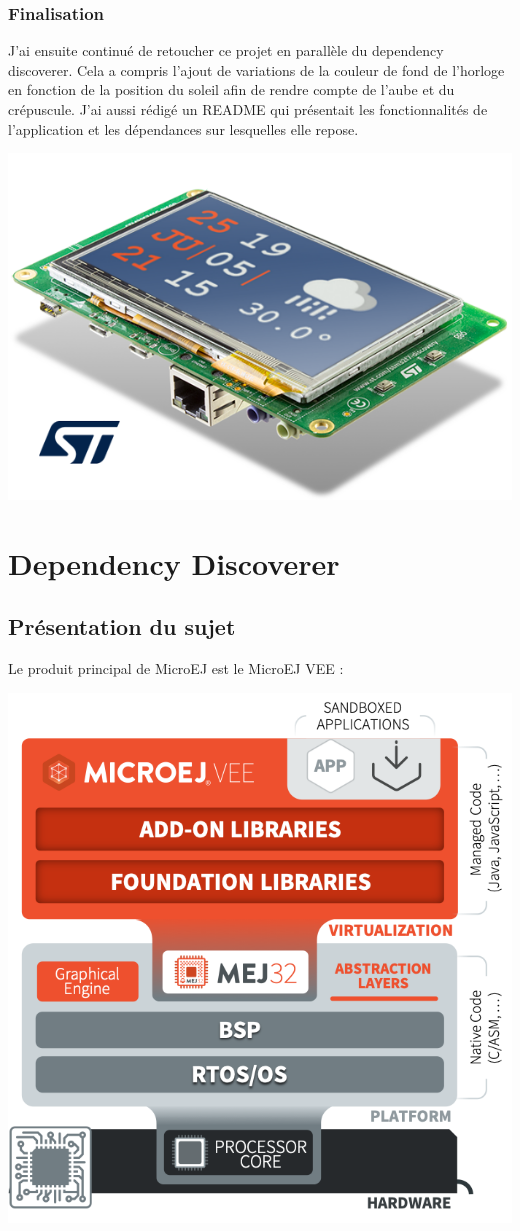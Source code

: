 \documentclass[french,a4paper,12pt]{report}
\begin{document}
\subsection{Finalisation}

J'ai ensuite continué de retoucher ce projet en parallèle du dependency discoverer. Cela a compris l'ajout de variations de la couleur de fond de l'horloge en fonction de la position du soleil afin de rendre compte de l'aube et du crépuscule. J'ai aussi rédigé un README qui présentait les fonctionnalités de l'application et les dépendances sur lesquelles elle repose.

\begin{center}
\includegraphics[width=.5\textwidth]{./ressources/schemas/inSituationFin.png}
\end{center}


\chapter{Dependency Discoverer}

\section{Présentation du sujet}

Le produit principal de MicroEJ est le MicroEJ VEE :

\begin{center}
  \includegraphics[width=.6\textwidth]{ressources/schemas/Implementations-on-hardware_minimize.png}
\end{center}
\end{document}
